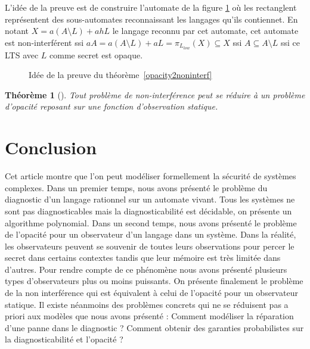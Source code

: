 \documentclass[10pt,a4paper]{article}
\newtheorem{myth}{Th\'eor\`eme}
\begin{document}
L'id\'ee de la preuve est de construire l'automate de la figure \ref{thfig} o\`u les rectanglent repr\'esentent des sous-automates reconnaissant les langages qu'ils contiennet. En notant $X=a(A\setminus L) + ahL$ le langage reconnu par cet automate, cet automate est non-interf\'erent ssi $aA=a(A\setminus L)+aL=\pi_{L_{low}}(X)\subseteq X$ ssi $A\subseteq A\setminus L$ ssi ce LTS avec $L$ comme secret est opaque.

\begin{figure}[H]
  \centering
  \caption{Id\'ee de la preuve du th\'eor\`eme~\ref{opacity2noninterf}}
  \label{thfig}
\end{figure}

\begin{myth}[]
Tout probl\`eme de non-interf\'erence peut se r\'eduire \`a un probl\`eme d'opacit\'e reposant sur une fonction d'observation statique.
\end{myth}

\section{Conclusion}

Cet article montre que l'on peut modéliser formellement la sécurité de systèmes complexes. Dans un premier temps, nous avons présenté le problème du diagnostic d'un langage rationnel sur un automate vivant. Tous les systèmes ne sont pas diagnosticables mais la diagnosticabilité est décidable, on présente un algorithme polynomial. Dans un second temps, nous avons présenté le problème de l'opacité  pour un observateur d'un langage dans un système. Dans la réalité, les observateurs peuvent se souvenir de toutes leurs observations pour percer le secret dans certains contextes tandis que leur mémoire est très limitée dans d'autres. Pour rendre compte de ce phénomène nous avons présenté plusieurs types d'observateurs plus ou moins puissants. On présente finalement le problème de la non interférence qui est équivalent à celui de l'opacité pour un observateur statique. Il existe néanmoins des problèmes concrets qui ne se réduisent pas a priori aux modèles que nous avons présenté : Comment modéliser la réparation d'une panne dans le diagnostic ? Comment obtenir des garanties probabilistes sur la diagnosticabilité et l'opacité ?


\end{document}
